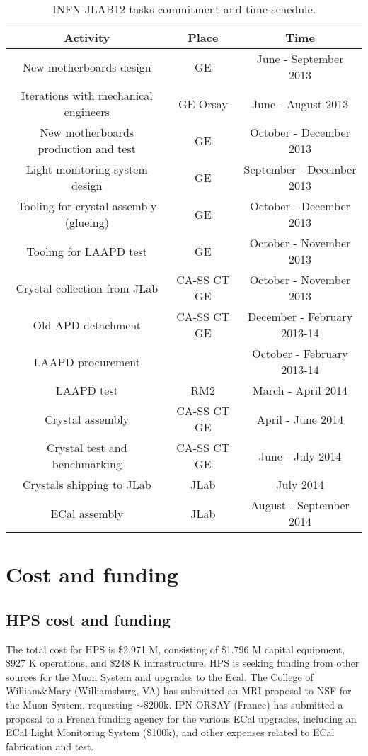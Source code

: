 \documentclass[11pt]{report}
\begin{document}
\begin{table}[htdp]
\caption{INFN-JLAB12 tasks commitment and time-schedule.}
\begin{center}
\begin{tabular}{|c|c|c|}
\hline
Activity & Place  & Time\\
\hline\hline
New motherboards design & GE &June - September 2013\\
\hline
Iterations with mechanical engineers & GE Orsay &June - August 2013\\
\hline

New motherboards production and test & GE & October - December 2013\\
\hline 
Light monitoring system design & GE & September - December 2013\\
\hline
Tooling for crystal assembly (glueing) & GE	& October - December 2013\\
\hline
Tooling for LAAPD test & GE&October - November 2013 \\
\hline
Crystal collection from JLab &CA-SS CT GE&  October - November 2013 \\
\hline
Old APD detachment & CA-SS CT GE&December - February 2013-14  \\
\hline
LAAPD procurement &  & October - February 2013-14  \\
\hline
LAAPD test & RM2 &  March - April 2014  \\
\hline
Crystal assembly &CA-SS CT GE  & April - June 2014  \\
\hline
Crystal test and benchmarking &CA-SS CT GE  & June - July 2014  \\
\hline
Crystals shipping to JLab & JLab & July 2014  \\
\hline
ECal assembly & JLab & August - September 2014  \\
\hline
\hline
\end{tabular}
\end{center}
\label{tb:infn_ts}
\end{table}%

\section{Cost and funding}
\subsection{HPS cost and funding}
The total cost for HPS is \$2.971 M, consisting of \$1.796 M capital equipment, \$927 K operations, and \$248 K infrastructure. 
HPS is seeking funding from other sources for the Muon System and upgrades to the Ecal.
The College of William\&Mary (Williamsburg, VA) has submitted an MRI proposal to NSF for the Muon System, requesting $\sim \$200$k. IPN ORSAY (France) 
has submitted a proposal to a French funding agency for the various ECal upgrades, including an ECal Light Monitoring System (\$100k),
 and other expenses related to ECal fabrication and test.
\end{document}
